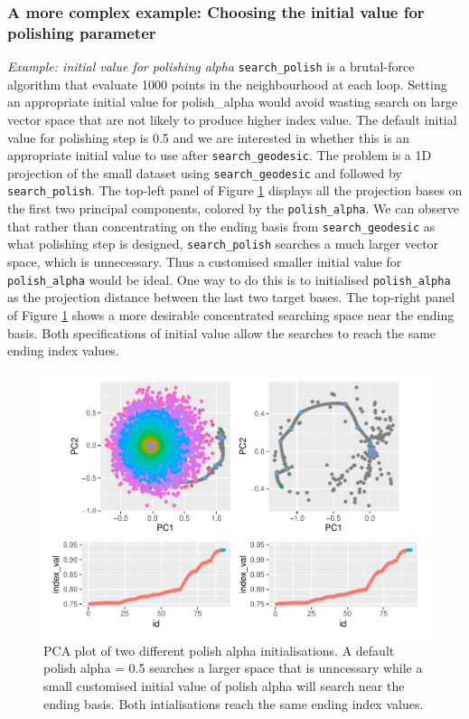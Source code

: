 \documentclass[12pt]{article}
\begin{document}
\hypertarget{a-more-complex-example-choosing-the-initial-value-for-polishing-parameter}{%
\subsubsection{A more complex example: Choosing the initial value for
polishing
parameter}\label{a-more-complex-example-choosing-the-initial-value-for-polishing-parameter}}

\emph{Example: initial value for polishing alpha}
\texttt{search\_polish} is a brutal-force algorithm that evaluate 1000
points in the neighbourhood at each loop. Setting an appropriate initial
value for polish\_alpha would avoid wasting search on large vector space
that are not likely to produce higher index value. The default initial
value for polishing step is 0.5 and we are interested in whether this is
an appropriate initial value to use after \texttt{search\_geodesic}. The
problem is a 1D projection of the small dataset using
\texttt{search\_geodesic} and followed by \texttt{search\_polish}. The
top-left panel of Figure \ref{polish-alpha} displays all the projection
bases on the first two principal components, colored by the
\texttt{polish\_alpha}. We can observe that rather than concentrating on
the ending basis from \texttt{search\_geodesic} as what polishing step
is designed, \texttt{search\_polish} searches a much larger vector
space, which is unnecessary. Thus a customised smaller initial value for
\texttt{polish\_alpha} would be ideal. One way to do this is to
initialised \texttt{polish\_alpha} as the projection distance between
the last two target bases. The top-right panel of Figure
\ref{polish-alpha} shows a more desirable concentrated searching space
near the ending basis. Both specifications of initial value allow the
searches to reach the same ending index values.

\begin{figure}
\centering
\includegraphics{paper_files/figure-latex/polish-alpha-1.pdf}
\caption{\label{polish-alpha}PCA plot of two different polish alpha
initialisations. A default polish alpha = 0.5 searches a larger space
that is unncessary while a small customised initial value of polish
alpha will search near the ending basis. Both intialisations reach the
same ending index values.}
\end{figure}
\end{document}
